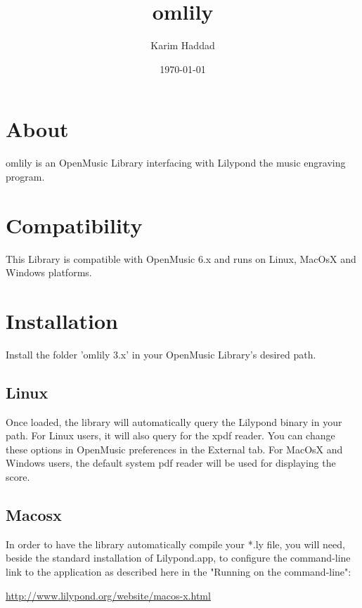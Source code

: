 \documentclass{article}
\let\urlorig\url
\renewcommand{\url}[1]{%
  \begin{otherlanguage}{english}\urlorig{#1}\end{otherlanguage}%
}
\begin{document}
\setlength{\parskip}{0.3cm}


\title{omlily}
\author{Karim Haddad}
\date{\today}
\maketitle

\section{About}

omlily\cite{haddad2016omlily} is an OpenMusic\cite{bresson2011openmusic} Library interfacing with Lilypond\cite{nienhuys2003lilypond} the music engraving program. 

\section{Compatibility}

This Library is compatible with OpenMusic 6.x and runs on Linux, MacOsX and Windows platforms.

\section{Installation}

Install the folder 'omlily 3.x' in your OpenMusic Library's desired path. 


\subsection{Linux} 

Once loaded, the library will automatically query the Lilypond binary in your path. For Linux users, it will also query for the xpdf reader. You can change these options in OpenMusic preferences in the External tab. For MacOsX and Windows users, the default system pdf reader will be used for displaying the score.


\subsection{Macosx}


In order to have the library automatically compile your *.ly file, you will need, beside the standard installation of Lilypond.app, to configure the command-line link to the application as described here in the "Running on the command-line": \url{http://www.lilypond.org/website/macos-x.html}
\end{document}
